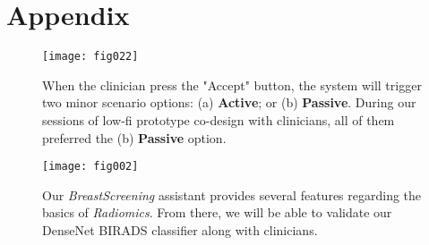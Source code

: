 \appendix
\addappheadtotoc
{}
\section{Appendix}
\label{sec:sec010}

\begin{figure}[htbp]
\onecolumn
\centering
\texttt{[image: fig022]}
\caption{When the clinician press the "Accept" button, the system will trigger two minor scenario options: (a) {\bf Active}; or (b) {\bf Passive}. During our sessions of low-fi prototype co-design with clinicians, all of them preferred the (b) {\bf Passive} option.}
\label{fig:fig022}
\twocolumn
\end{figure}

\begin{figure}[htbp]
\onecolumn
\centering
\texttt{[image: fig002]}
\caption{Our {\it BreastScreening} assistant provides several features regarding the basics of {\it Radiomics}. From there, we will be able to validate our DenseNet BIRADS classifier along with clinicians.}
\label{fig:fig002}
\twocolumn
\end{figure}
